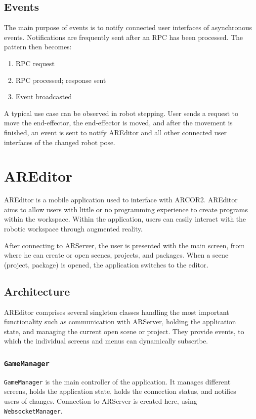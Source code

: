 \subsection{Events}
The main purpose of events is to notify connected user interfaces of asynchronous events. Notifications are frequently sent after an RPC has been processed. The pattern then becomes:
\begin{enumerate}
    \item RPC request
    \item RPC processed; response sent
    \item Event broadcasted
\end{enumerate}

A typical use case can be observed in robot stepping. User sends a request to move the end-effector, the end-effector is moved, and after the movement is finished, an event is sent to notify AREditor and all other connected user interfaces of the changed robot pose.

\section{AREditor}
AREditor is a mobile application used to interface with ARCOR2. AREditor aims to allow users with little or no programming experience to create programs within the workspace. Within the application, users can easily interact with the robotic workspace through augmented reality. 

After connecting to ARServer, the user is presented with the main screen, from where he can create or open scenes, projects, and packages. When a scene (project, package) is opened, the application switches to the editor.

\subsection{Architecture}

AREditor comprises several singleton classes handling the most important functionality such as communication with ARServer, holding the application state, and managing the current open scene or project. They provide events, to which the individual screens and menus can dynamically subscribe.

\subsubsection{\texttt{GameManager}}

\texttt{GameManager} is the main controller of the application. It manages different screens, holds the application state, holds the connection status, and notifies users of changes. Connection to ARServer is created here, using \texttt{WebsocketManager}. 

